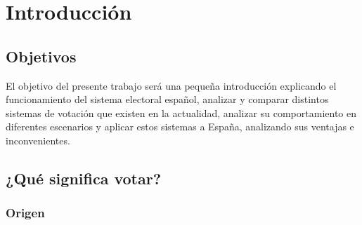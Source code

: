 \documentclass[12pt,a4paper,]{book}
\def\ifdoblecara{} %
\def\ifprincipal{} %
\numberwithin{dummy}{section}
\theoremstyle{ocrenumbox}
\theoremstyle{blacknumex}
\theoremstyle{blacknumbox}
\theoremstyle{ocrenum}
\theoremstyle{ocrenum}
\begin{document}
\cleardoublepage


\ifdefined\ifdoblecara
\fancyhead[LE,RO]{\scriptsize\rightmark}
\fancyfoot[LO,RE]{\scriptsize\slshape \leftmark}
\fancyfoot[C]{}
\fancyfoot[LE,RO]{\footnotesize\thepage}
\else
\fancyhead[RO]{\scriptsize\rightmark}
\fancyfoot[LO]{\scriptsize\slshape \leftmark}
\fancyfoot[C]{}
\fancyfoot[RO]{\footnotesize\thepage}
\fi

\renewcommand{\headrulewidth}{0.4pt}
\renewcommand{\footrulewidth}{0.4pt}

\ifdefined\ifprincipal
\else
\setlength{\parindent}{1em}
\pagestyle{fancy}
\setcounter{tocdepth}{4}
\tableofcontents

\fi

\ifdefined\ifdoblecara
\fancyhead{}{}
\fancyhead[LE,RO]{\scriptsize\rightmark}
\fancyfoot[LO,RE]{\scriptsize\slshape \leftmark}
\fancyfoot[C]{}
\fancyfoot[LE,RO]{\footnotesize\thepage}
\else
\fancyhead{}{}
\fancyhead[RO]{\scriptsize\rightmark}
\fancyfoot[LO]{\scriptsize\slshape \leftmark}
\fancyfoot[C]{}
\fancyfoot[RO]{\footnotesize\thepage}
\fi
\renewcommand{\headrulewidth}{0.4pt}
\renewcommand{\footrulewidth}{0.4pt}

\hypertarget{introducciuxf3n}{%
\chapter{Introducción}\label{introducciuxf3n}}

\hypertarget{objetivos}{%
\section{Objetivos}\label{objetivos}}

El objetivo del presente trabajo será una pequeña introducción
explicando el funcionamiento del sistema electoral español, analizar y
comparar distintos sistemas de votación que existen en la actualidad,
analizar su comportamiento en diferentes escenarios y aplicar estos
sistemas a España, analizando sus ventajas e inconvenientes.

\hypertarget{quuxe9-significa-votar}{%
\section{¿Qué significa votar?}\label{quuxe9-significa-votar}}

\hypertarget{origen}{%
\subsection{Origen}\label{origen}}
\end{document}
